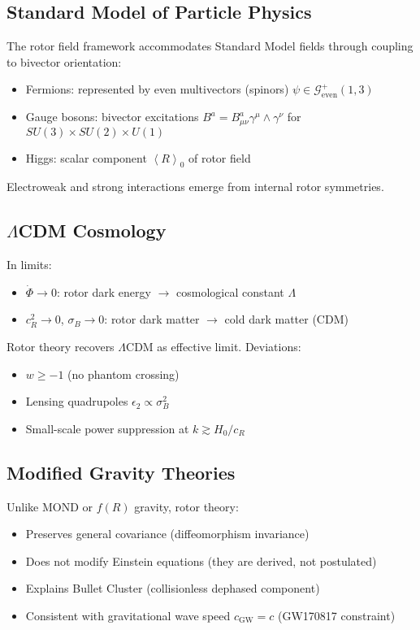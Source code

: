 \documentclass[11pt,a4paper]{article}
\numberwithin{equation}{section}
\theoremstyle{plain}
\theoremstyle{definition}
\theoremstyle{remark}
\newcommand{\Cl}{\mathcal{G}}               %
\newcommand{\grade}[2]{\left\langle #1 \right\rangle_{#2}}
\newcommand{\scal}[1]{\grade{#1}{0}}       %
\begin{document}
\subsection{Standard Model of Particle Physics}

The rotor field framework accommodates Standard Model fields through coupling to bivector orientation:
\begin{itemize}
\item Fermions: represented by even multivectors (spinors) $\psi \in \Cl^+_{\mathrm{even}}(1,3)$
\item Gauge bosons: bivector excitations $B^a = B^a_{\mu\nu}\gamma^\mu \wedge \gamma^\nu$ for $SU(3) \times SU(2) \times U(1)$
\item Higgs: scalar component $\scal{R}$ of rotor field
\end{itemize}

Electroweak and strong interactions emerge from internal rotor symmetries.

\subsection{$\Lambda$CDM Cosmology}

In limits:
\begin{itemize}
\item $\dot{\Phi} \to 0$: rotor dark energy $\to$ cosmological constant $\Lambda$
\item $c_R^2 \to 0$, $\sigma_B \to 0$: rotor dark matter $\to$ cold dark matter (CDM)
\end{itemize}

Rotor theory recovers $\Lambda$CDM as effective limit. Deviations:
\begin{itemize}
\item $w \geq -1$ (no phantom crossing)
\item Lensing quadrupoles $\epsilon_2 \propto \sigma_B^2$
\item Small-scale power suppression at $k \gtrsim H_0/c_R$
\end{itemize}

\subsection{Modified Gravity Theories}

Unlike MOND or $f(R)$ gravity, rotor theory:
\begin{itemize}
\item Preserves general covariance (diffeomorphism invariance)
\item Does not modify Einstein equations (they are derived, not postulated)
\item Explains Bullet Cluster (collisionless dephased component)
\item Consistent with gravitational wave speed $c_{\mathrm{GW}} = c$ (GW170817 constraint)
\end{itemize}
\end{document}
